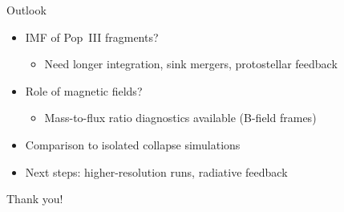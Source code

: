\documentclass[aspectratio=169, 12pt]{beamer}
\begin{document}
\begin{frame}{Outlook}
\begin{itemize}
  \item IMF of Pop~III fragments?
        \begin{itemize}
          \item Need longer integration, sink mergers, protostellar
                feedback
        \end{itemize}
  \vspace{0.4em}
  \item Role of magnetic fields?
        \begin{itemize}
          \item Mass-to-flux ratio diagnostics available
                (B-field frames)
        \end{itemize}
  \vspace{0.4em}
  \item Comparison to isolated collapse simulations
  \vspace{0.4em}
  \item Next steps: higher-resolution runs, radiative feedback
\end{itemize}

\vspace{1em}
\centering
\large\textcolor{accent}{Thank you!}
\end{frame}
\end{document}
